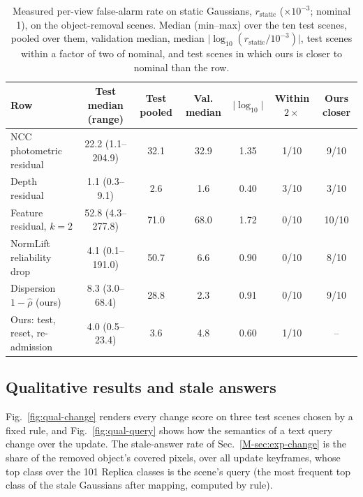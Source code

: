 \documentclass[journal]{IEEEtran}
\newcommand{\secref}[1]{Sec.~\mbox{\ref{#1}}}       %
\begin{document}
\begin{table}[t]
\centering
\caption{Measured per-view false-alarm rate on static Gaussians, $r_{\mathrm{static}}$ ($\times10^{-3}$; nominal 1), on the object-removal scenes. Median (min--max) over the ten test scenes, pooled over them, validation median, median $\lvert\log_{10}(r_{\mathrm{static}}/10^{-3})\rvert$, test scenes within a factor of two of nominal, and test scenes in which ours is closer to nominal than the row.}
\label{tab:rstatic}
\footnotesize
\begin{tabular}{@{}lcccccc@{}}
\toprule
Row & Test median (range) & Test pooled & Val. median & $\lvert\log_{10}\rvert$ & Within $2\times$ & Ours closer\\
\midrule
NCC photometric residual & 22.2 (1.1--204.9) & 32.1 & 32.9 & 1.35 & 1/10 & 9/10\\
Depth residual & 1.1 (0.3--9.1) & 2.6 & 1.6 & 0.40 & 3/10 & 3/10\\
Feature residual, $k=2$ & 52.8 (4.3--277.8) & 71.0 & 68.0 & 1.72 & 0/10 & 10/10\\
NormLift reliability drop & 4.1 (0.1--191.0) & 50.7 & 6.6 & 0.90 & 0/10 & 8/10\\
Dispersion $1-\hat\rho$ (ours) & 8.3 (3.0--68.4) & 28.8 & 2.3 & 0.91 & 0/10 & 9/10\\
Ours: test, reset, re-admission & 4.0 (0.5--23.4) & 3.6 & 4.8 & 0.60 & 1/10 & --\\
\bottomrule
\end{tabular}
\end{table}


\subsection{Qualitative results and stale answers}
Fig.~\ref{fig:qual-change} renders every change score on three test scenes chosen by a fixed rule, and Fig.~\ref{fig:qual-query} shows how the semantics of a text query change over the update. The stale-answer rate of \secref{M-sec:exp-change} is the share of the removed object's covered pixels, over all update keyframes, whose top class over the 101 Replica classes is the scene's query (the most frequent top class of the stale Gaussians after mapping, computed by rule).
\end{document}
